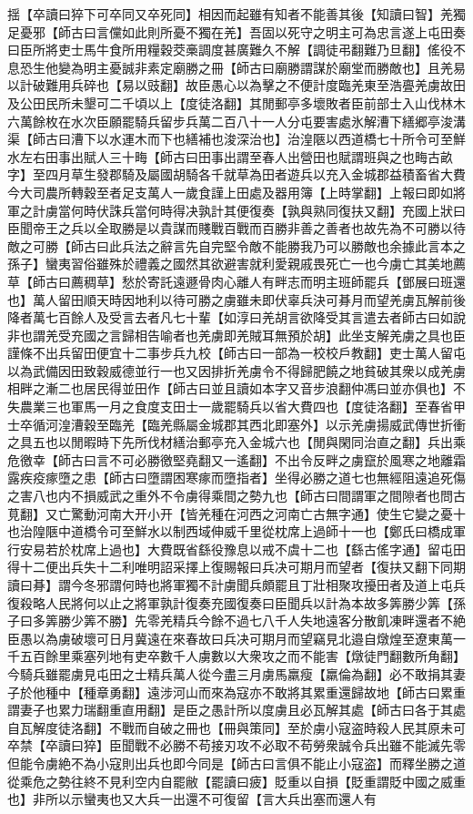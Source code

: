 揺【卒讀曰猝下可卒同又卒死同】相因而起雖有知者不能善其後【知讀曰智】羌獨足憂邪【師古曰言儻如此則所憂不獨在羌】吾固以死守之明主可為忠言遂上屯田奏曰臣所將吏士馬牛食所用糧穀茭槀調度甚廣難久不解【調徒弔翻難乃旦翻】傜役不息恐生他變為明主憂誠非素定廟勝之冊【師古曰廟勝謂謀於廟堂而勝敵也】且羌易以計破難用兵碎也【易以豉翻】故臣愚心以為擊之不便計度臨羌東至浩亹羌虜故田及公田民所未墾可二千頃以上【度徒洛翻】其閒郵亭多壞敗者臣前部士入山伐林木六萬餘枚在水次臣願罷騎兵留步兵萬二百八十一人分屯要害處氷解漕下繕郷亭浚溝渠【師古曰漕下以水運木而下也繕補也浚深治也】治湟陿以西道橋七十所令可至鮮水左右田事出賦人三十畮【師古曰田事出謂至春人出營田也賦謂班與之也畮古畝字】至四月草生發郡騎及屬國胡騎各千就草為田者遊兵以充入金城郡益積畜省大費今大司農所轉穀至者足支萬人一歲食謹上田處及器用簿【上時掌翻】上報曰即如將軍之計虜當何時伏誅兵當何時得决孰計其便復奏【孰與熟同復扶又翻】充國上狀曰臣聞帝王之兵以全取勝是以貴謀而賤戰百戰而百勝非善之善者也故先為不可勝以待敵之可勝【師古曰此兵法之辭言先自完堅令敵不能勝我乃可以勝敵也余據此言本之孫子】蠻夷習俗雖殊於禮義之國然其欲避害就利愛親戚畏死亡一也今虜亡其美地薦草【師古曰薦稠草】愁於寄託遠遯骨肉心離人有畔志而明主班師罷兵【鄧展曰班還也】萬人留田順天時因地利以待可勝之虜雖未即伏辜兵決可朞月而望羌虜瓦解前後降者萬七百餘人及受言去者凡七十輩【如淳曰羌胡言欲降受其言遣去者師古曰如說非也謂羌受充國之言歸相告喻者也羌虜即羌賊耳無預於胡】此坐支解羌虜之具也臣謹條不出兵留田便宜十二事步兵九校【師古曰一部為一校校戶教翻】吏士萬人留屯以為武備因田致穀威德並行一也又因排折羌虜令不得歸肥饒之地貧破其衆以成羌虜相畔之漸二也居民得並田作【師古曰並且讀如本字又音步浪翻仲馮曰並亦俱也】不失農業三也軍馬一月之食度支田士一歲罷騎兵以省大費四也【度徒洛翻】至春省甲士卒循河湟漕穀至臨羌【臨羌縣屬金城郡其西北即塞外】以示羌虜揚威武傳世折衝之具五也以閒暇時下先所伐材繕治郵亭充入金城六也【閒與閑同治直之翻】兵出乘危徼幸【師古曰言不可必勝徼堅堯翻又一遙翻】不出令反畔之虜竄於風寒之地離霜露疾疫瘃墮之患【師古曰墮謂困寒瘃而墮指者】坐得必勝之道七也無經阻遠追死傷之害八也内不損威武之重外不令虜得乘間之勢九也【師古曰間謂軍之間隙者也問古莧翻】又亡驚動河南大开小开【皆羌種在河西之河南亡古無字通】使生它變之憂十也治隍陿中道橋令可至鮮水以制西域伸威千里從枕席上過師十一也【鄭氏曰橋成軍行安易若於枕席上過也】大費既省繇役豫息以戒不虞十二也【繇古傜字通】留屯田得十二便出兵失十二利唯明詔采擇上復賜報曰兵决可期月而望者【復扶又翻下同期讀曰朞】謂今冬邪謂何時也將軍獨不計虜聞兵頗罷且丁壯相聚攻擾田者及道上屯兵復殺略人民將何以止之將軍孰計復奏充國復奏曰臣聞兵以計為本故多筭勝少筭【孫子曰多筭勝少筭不勝】先零羌精兵今餘不過七八千人失地遠客分散飢凍畔還者不絶臣愚以為虜破壞可日月冀遠在來春故曰兵决可期月而望竊見北邉自燉煌至遼東萬一千五百餘里乘塞列地有吏卒數千人虜數以大衆攻之而不能害【燉徒門翻數所角翻】今騎兵雖罷虜見屯田之士精兵萬人從今盡三月虜馬羸瘦【羸倫為翻】必不敢捐其妻子於他種中【種章勇翻】遠涉河山而來為寇亦不敢將其累重還歸故地【師古曰累重謂妻子也累力瑞翻重直用翻】是臣之愚計所以度虜且必瓦解其處【師古曰各于其處自瓦解度徒洛翻】不戰而自破之冊也【冊與策同】至於虜小寇盗時殺人民其原未可卒禁【卒讀曰猝】臣聞戰不必勝不苟接刃攻不必取不苟勞衆誠令兵出雖不能滅先零但能令虜絶不為小寇則出兵也即今同是【師古曰言俱不能止小寇盗】而釋坐勝之道從乘危之勢往終不見利空内自罷敝【罷讀曰疲】貶重以自損【貶重謂貶中國之威重也】非所以示蠻夷也又大兵一出還不可復留【言大兵出塞而還人有